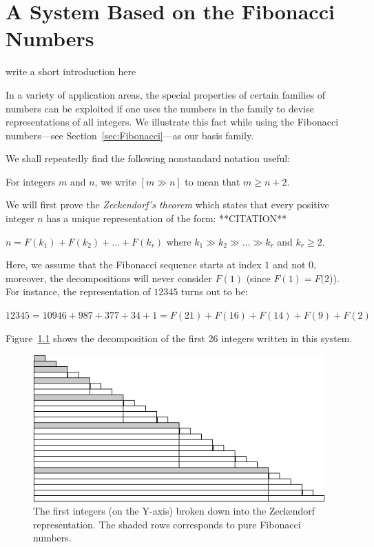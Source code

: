 
\chapter{A System Based on the Fibonacci Numbers}
\label{sec:numerals-special-families}
\label{sec:Fibo-numbers}

{\Denis write a short introduction here}

In a variety of application areas, the special properties of certain
families of numbers can be exploited if one uses the numbers in the
family to devise representations of all integers.  We illustrate this
fact while using the Fibonacci numbers---see
Section~\ref{sec:Fibonacci}---as our basis family.

\noindent
We shall repeatedly find the following nonstandard notation useful:

For integers $m$ and $n$, we write $[m \gg n]$ to mean that $m \geq
n+2$.

\medskip


We will first prove the \textit{Zeckendorf's theorem} which states
that every positive integer $n$ has a unique representation of the
form:  **CITATION**

$n = F(k_1) + F(k_2) + ... + F(k_r)$ where $k_1 \gg k_2 \gg ... \gg k_r$ and $k_r \geq 2$.

Here, we assume that the Fibonacci sequence starts at index $1$ and not $0$,
moreover, the decompositions will never consider $F(1)$ (since $F(1)=F(2$)). 
For instance, the representation of $12345$ turns out to be:

$12345 = 10946 + 987 + 377 + 34 + 1 = F(21) + F(16) + F(14) + F(9) + F(2)$
\bigskip

Figure~\ref{zeckendorf} shows the decomposition of the first 26 integers written in this system. 
\begin{figure}[h]
\begin{center}
        \includegraphics[scale=0.6]{FiguresArithmetic/Zeckendorf}
        \caption{The first integers (on the Y-axis) broken down into the Zeckendorf representation.
        The shaded rows corresponds to pure Fibonacci numbers.}
\label{zeckendorf}
\end{center}
\end{figure}

